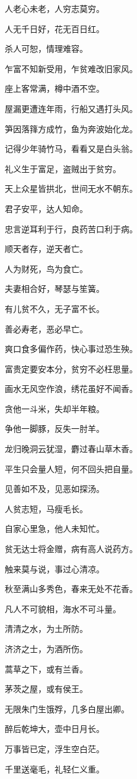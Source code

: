\documentclass[12pt,oneside]{book}
\begin{document}
人老心未老，人穷志莫穷。

人无千日好，花无百日红。

杀人可恕，情理难容。

乍富不知新受用，乍贫难改旧家风。

座上客常满，樽中酒不空。

屋漏更遭连年雨，行船又遇打头风。

笋因落箨方成竹，鱼为奔波始化龙。

记得少年骑竹马，看看又是白头翁。

礼义生于富足，盗贼出于贫穷。

天上众星皆拱北，世间无水不朝东。

君子安平，达人知命。

忠言逆耳利于行，良药苦口利于病。

顺天者存，逆天者亡。

人为财死，鸟为食亡。

夫妻相合好，琴瑟与笙簧。

有儿贫不久，无子富不长。

善必寿老，恶必早亡。

爽口食多偏作药，快心事过恐生殃。

富贵定要安本分，贫穷不必枉思量。

画水无风空作浪，绣花虽好不闻香。

贪他一斗米，失却半年粮。

争他一脚豚，反失一肘羊。

龙归晚洞云犹湿，麝过春山草木香。

平生只会量人短，何不回头把自量。

见善如不及，见恶如探汤。

人贫志短，马瘦毛长。

自家心里急，他人未知忙。

贫无达士将金赠，病有高人说药方。

触来莫与说，事过心清凉。

秋至满山多秀色，春来无处不花香。

凡人不可貌相，海水不可斗量。

清清之水，为土所防。

济济之士，为酒所伤。

蒿草之下，或有兰香。

茅茨之屋，或有侯王。

无限朱门生饿殍，几多白屋出卿。

醉后乾坤大，壶中日月长。

万事皆已定，浮生空白茫。

千里送毫毛，礼轻仁义重。
\end{document}
